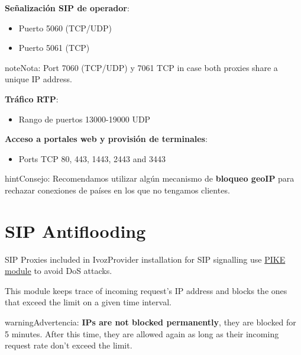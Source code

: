 \documentclass[letterpaper,10pt,spanish]{sphinxmanual}
\begin{document}
\textbf{Señalización SIP de operador}:
\begin{itemize}
\item {} 
Puerto 5060 (TCP/UDP)

\item {} 
Puerto 5061 (TCP)

\end{itemize}

\begin{notice}{note}{Nota:}
Port 7060 (TCP/UDP) y 7061 TCP in case both proxies share a unique IP address.
\end{notice}

\textbf{Tráfico RTP}:
\begin{itemize}
\item {} 
Rango de puertos 13000-19000 UDP

\end{itemize}

\textbf{Acceso a portales web y provisión de terminales}:
\begin{itemize}
\item {} 
Ports TCP 80, 443, 1443, 2443 and 3443

\end{itemize}

\begin{notice}{hint}{Consejo:}
Recomendamos utilizar algún mecanismo de \textbf{bloqueo geoIP} para rechazar conexiones de países en los que no tengamos clientes.
\end{notice}


\section{SIP Antiflooding}
\label{security_and_maintenance/security/antiflooding::doc}\label{security_and_maintenance/security/antiflooding:sip-antiflooding}\label{security_and_maintenance/security/antiflooding:id1}
SIP Proxies included in IvozProvider installation for SIP signalling use
\href{http://kamailio.org/docs/modules/5.1.x/modules/pike.html}{PIKE module} to avoid DoS attacks.

This module keeps trace of incoming request's IP address and blocks the ones that exceed the limit on a given time
interval.

\begin{notice}{warning}{Advertencia:}
\textbf{IPs are not blocked permanently}, they are blocked for 5 minutes. After this time, they are allowed again
as long as their incoming request rate don't exceed the limit.
\end{notice}
\end{document}

